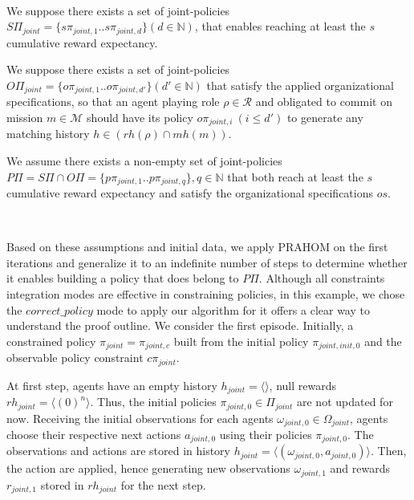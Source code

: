 \begin{proofoutline}
    \

    \noindent We suppose there exists a set of joint-policies $S\Pi_{joint} = \{s\pi_{joint,1}.. s\pi_{joint,d}\} \allowbreak (d \in \mathbb{N})$, that enables reaching at least the $s$ cumulative reward expectancy.

    \noindent We suppose there exists a set of joint-policies $O\Pi_{joint} = \{o\pi_{joint,1}.. o\pi_{joint,d'}\} (d' \in \mathbb{N})$ that satisfy the applied organizational specifications, so that an agent playing role $\rho \in \mathcal{R}$ and obligated to commit on mission $m \in \mathcal{M}$ should have its policy $o\pi_{joint,i} \ (i \leq d')$ to generate any matching history $h \in (rh(\rho) \cap mh(m))$.

    \noindent We assume there exists a non-empty set of joint-policies $P\Pi = S\Pi \cap O\Pi \allowbreak = \{p\pi_{joint,1}..p\pi_{joint,q}\}, q \in \mathbb{N}$ that both reach at least the $s$ cumulative reward expectancy and satisfy the organizational specifications $os$.

    \

    Based on these assumptions and initial data, we apply PRAHOM on the first iterations and generalize it to an indefinite number of steps to determine whether it enables building a policy that does belong to $P\Pi$. Although all constraints integration modes are effective in constraining policies, in this example, we chose the $correct\_policy$ mode to apply our algorithm for it offers a clear way to understand the proof outline.
    We consider the first episode. Initially, a constrained policy $\pi_{joint} = \pi_{joint,c}$ built from the initial policy $\pi_{joint,init,0}$ and the observable policy constraint $c\pi_{joint}$.

    At first step, agents have an empty history $h_{joint} = \langle \rangle$, null rewards $rh_{joint} = \langle (0)^n \rangle $. Thus, the initial policies $\pi_{joint,0} \in \Pi_{joint}$ are not updated for now. Receiving the initial observations for each agents $\omega_{joint,0} \in \Omega_{joint}$, agents choose their respective next actions $a_{joint,0}$ using their policies $\allowbreak \pi_{joint,0}$. The observations and actions are stored in history $h_{joint} \allowbreak = \allowbreak \langle \allowbreak (\omega_{joint,0}, \allowbreak a_{joint,0}) \rangle$. Then, the action are applied, hence generating new observations $\omega_{joint,1}$ and rewards $r_{joint,1}$ stored in $rh_{joint}$ for the next step.



\end{proofoutline}
